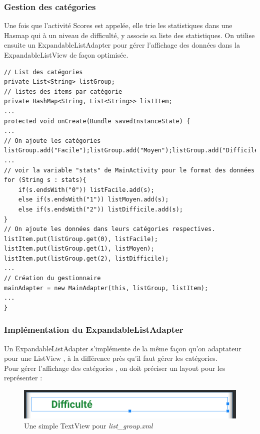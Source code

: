 \documentclass{article}
\begin{document}
\subsubsection{Gestion des catégories}
Une fois que l'activité Scores est appelée, elle trie les statistiques dans une Hasmap qui à un niveau de difficulté, y associe sa liste des statistiques. On utilise ensuite un ExpandableListAdapter pour gérer l'affichage des données dans la ExpandableListView de façon optimisée.

\begin{verbatim}
// List des catégories
private List<String> listGroup;
// listes des items par catégorie
private HashMap<String, List<String>> listItem;
...
protected void onCreate(Bundle savedInstanceState) {
...
// On ajoute les catégories
listGroup.add("Facile");listGroup.add("Moyen");listGroup.add("Difficile");
...
// voir la variable "stats" de MainActivity pour le format des données
for (String s : stats){
    if(s.endsWith("0")) listFacile.add(s);
    else if(s.endsWith("1")) listMoyen.add(s);
    else if(s.endsWith("2")) listDifficile.add(s);
}
// On ajoute les données dans leurs catégories respectives.
listItem.put(listGroup.get(0), listFacile);
listItem.put(listGroup.get(1), listMoyen);
listItem.put(listGroup.get(2), listDifficile);
...
// Création du gestionnaire
mainAdapter = new MainAdapter(this, listGroup, listItem);
...
}
\end{verbatim}

\subsubsection{Implémentation du ExpandableListAdapter}
Un ExpandableListAdapter s'implémente de la même façon qu'on adaptateur pour une ListView \cite{androidProf}, à la différence près qu'il faut gérer les catégories.\\
Pour gérer l'affichage des catégories \cite{listView}, on doit préciser un layout pour les représenter :

\begin{figure}[H]
    \centering
    \includegraphics[width=0.7\linewidth]{Ressources/androidGroupLayout.png}
    \caption{Une simple TextView pour \textit{list\_group.xml}}
\end{figure}
\end{document}
